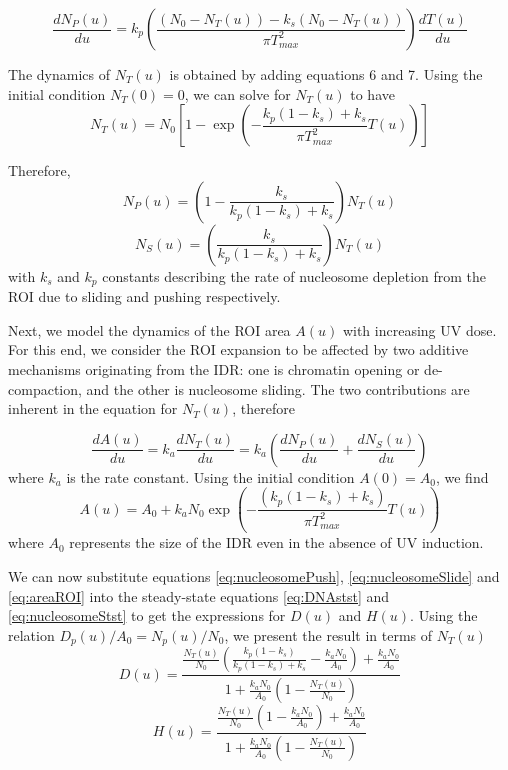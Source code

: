 \documentclass[12pt]{article}
\begin{document}
	\begin{equation*}
    \frac{dN_P(u)}{du}=k_p\left(\frac{(N_0-N_T(u))-k_s(N_0-N_T(u))}{\pi T_{max}^2}\right)\frac{dT(u)}{du}
	\end{equation*}
	
	The dynamics of $N_T(u)$ is obtained by adding equations 6 and 7. Using
	the initial condition $N_T(0) = 0$, we can solve for $N_T(u)$ to have
	\begin{equation}\label{eq:totalNucleosomeLossIDR}
	N_T(u) = N_0\left[1-\exp\left(-\frac{k_p(1-k_s)+k_s}{\pi T_{max}^2}T(u)\right)\right]
	\end{equation}
	
	Therefore, 
	\begin{equation}\label{eq:nucleosomePush}
	N_P(u) = \left(1-\frac{k_s}{k_p(1-k_s)+k_s}\right)N_T(u)
	\end{equation}
	\begin{equation}\label{eq:nucleosomeSlide}
	N_S(u) = \left(\frac{k_s}{k_p(1-k_s)+k_s}\right)N_T(u)
	\end{equation}
	with $k_s$ and $k_p$ constants describing the rate of nucleosome depletion from
	the ROI due to sliding and pushing respectively.
	
	Next, we model the dynamics of the ROI area $A(u)$ with increasing UV
	dose. For this end, we consider the ROI expansion to be affected by two
	additive mechanisms originating from the IDR: one is chromatin opening or
	de-compaction, and the other is nucleosome sliding. The two contributions
	are inherent in the equation for $N_T(u)$, therefore
	
	\begin{equation*}
	\frac{dA(u)}{du}=k_a\frac{dN_T(u)}{du}=k_a\left(\frac{dN_P(u)}{du}+\frac{dN_S(u)}{du}\right)
	\end{equation*}
	where $k_a$ is the rate constant. Using the initial condition $A(0) = A_0$, we find
	\begin{equation}\label{eq:areaROI}
	A(u) = A_0+ k_aN_0\exp\left(-\frac{(k_p(1-k_s)+k_s)}{\pi T_{max}^2}T(u)\right)
	\end{equation}
	where $A_0$ represents the size of the IDR even in the absence of UV induction.
	
	We can now substitute equations \eqref{eq:nucleosomePush}, \eqref{eq:nucleosomeSlide} and \eqref{eq:areaROI} into the steady-state equations \eqref{eq:DNAstst} and \eqref{eq:nucleosomeStst} to get the expressions for $D(u)$ and $H(u)$. Using the relation $D_p(u)/A_0 = N_p(u)/N_0$, we present the result in terms of $N_T(u)$			
	\begin{equation}\label{eq:DNALoss}
	D(u) = \frac{\frac{N_T(u)}{N_0}\left(\frac{k_p(1-k_s)}{k_p(1-k_s)+k_s}-\frac{k_aN_0}{A_0}\right)+\frac{k_aN_0}{A_0}}{1+\frac{k_aN_0}{A_0}\left(1-\frac{N_T(u)}{N_0}\right)}
	\end{equation}
	\begin{equation}\label{eq:nucleosomeLoss}
		H(u) = \frac{\frac{N_T(u)}{N_0}\left(1-\frac{k_aN_0}{A_0}\right)+\frac{k_aN_0}{A_0}}{1+\frac{k_aN_0}{A_0}\left(1-\frac{N_T(u)}{N_0}\right)}
	\end{equation}
	
\end{document}
